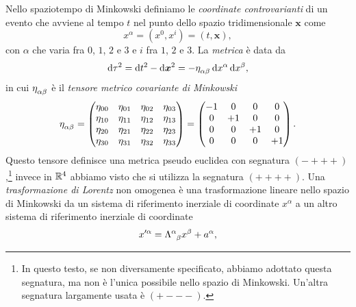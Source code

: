 Nello spaziotempo di Minkowski definiamo le
\emph{coordinate controvarianti} di un evento
che avviene al tempo $t$ nel punto dello spazio tridimensionale $\bm{x}$ come
\begin{equation}
  \label{eq:coord-controvariante}
  x^{\alpha} = (x^{0},x^{i}) = (t, \bm{x}),
\end{equation}
con $\alpha$ che varia fra $0$, $1$, $2$ e $3$ e $i$ fra $1$, $2$ e $3$.  La
\emph{metrica} è data da
\begin{equation}
  \dd \tau^{2} = \dd t^{2} - \dd \bm{x}^{2} = -\tensor{\eta}{_{\alpha\beta}}\dd
  x^{\alpha} \dd x^{\beta},
\end{equation}
in cui $\tensor{\eta}{_{\alpha\beta}}$ è il
\emph{tensore metrico covariante di Minkowski}
\begin{equation}
  \label{eq:tensore-metrico-controvariante}
  \tensor{\eta}{_{\alpha\beta}} =
  \begin{pmatrix}
   \eta_{00} & \eta_{01} & \eta_{02} & \eta_{03} \\
   \eta_{10} & \eta_{11} & \eta_{12} & \eta_{13} \\
   \eta_{20} & \eta_{21} & \eta_{22} & \eta_{23} \\
   \eta_{30} & \eta_{31} & \eta_{32} & \eta_{33}
  \end{pmatrix}
  =
  \begin{pmatrix}
    -1 & 0  & 0  & 0 \\
    0  & +1 & 0  & 0 \\
    0  & 0  & +1 & 0 \\
    0  & 0  & 0  & +1
  \end{pmatrix}.
\end{equation}
Questo tensore definisce una metrica pseudo euclidea con segnatura
$(-+++)$,\footnote{In questo testo, se non diversamente specificato, abbiamo
  adottato questa segnatura, ma non è l'unica possibile nello spazio di
  Minkowski.  Un'altra segnatura largamente usata è $(+---)$.}
invece in $\mathbb{R}^{4}$ abbiamo visto che si utilizza la segnatura $(++++)$.  Una
\emph{trasformazione di Lorentz} non omogenea è
una trasformazione lineare nello spazio di Minkowski da un sistema di
riferimento inerziale di coordinate $x^{\alpha}$ a un altro sistema di
riferimento inerziale di coordinate
\begin{equation}
  \label{eq:trasformazione-lineare}
  x'^{\alpha} = \tensor{\Lambda}{^{\alpha}_{\beta}}x^{\beta} + a^{\alpha},
\end{equation}
